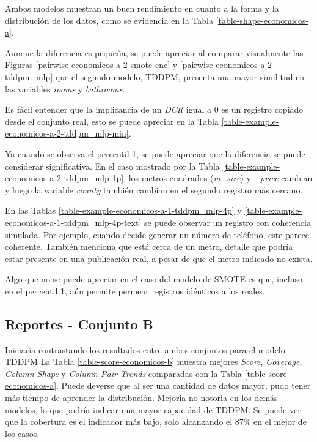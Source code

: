 Ambos modelos muestran un buen rendimiento en cuanto a la forma y la distribución de los datos, como se evidencia en la Tabla \ref{table-shape-economicos-a}.
%

%
\newpage
Aunque la diferencia es pequeña, se puede apreciar al comparar visualmente las Figuras \ref{pairwise-economicos-a-2-smote-enc} y \ref{pairwise-economicos-a-2-tddpm_mlp} que el segundo modelo, TDDPM, presenta una mayor similitud en las variables \emph{rooms} y \emph{bathrooms}.


\newpage
Es fácil entender que la implicancia de un \emph{DCR} igual a 0 es un registro copiado desde el conjunto real, esto se puede apreciar en la Tabla \ref{table-example-economicos-a-2-tddpm_mlp-min}.

Ya cuando se observa el percentil 1, se puede apreciar que la diferencia se puede considerar significativa. En el caso mostrado por la Tabla \ref{table-example-economicos-a-2-tddpm_mlp-1p}, los metros cuadrados (\emph{m\_size}) y \emph{\_price} cambian y luego la variable \emph{county} también cambian en el segundo registro más cercano.

\newpage
En las Tablas \ref{table-example-economicos-a-1-tddpm_mlp-4p} y \ref{table-example-economicos-a-1-tddpm_mlp-4p-text} se puede observar un registro con coherencia simulada. Por ejemplo, cuando decide generar un número de teléfono, este parece coherente. También menciona que está cerca de un metro, detalle que podría estar presente en una publicación real, a pesar de que el metro indicado no exista.


\newpage
Algo que no se puede apreciar en el caso del modelo de SMOTE es que, incluso en el percentil 1, aún permite permear registros idénticos a los reales.




\newpage
\subsection{Reportes - Conjunto B}
\label{ds-conjunto-b}
Iniciaría contrastando los resultados entre ambos conjuntos para el modelo TDDPM La Tabla \ref{table-score-economicos-b} muestra mejores \emph{Score}, \emph{Coverage}, \emph{Column Shape} y \emph{Column Pair Trends} comparadas con la Tabla \ref{table-score-economicos-a}. Puede deverse que al ser una cantidad de datos mayor, pudo tener más tiempo de aprender la distribución. Mejoria no notoria en los demás modelos, lo que podría indicar una mayor capacidad de TDDPM. Se puede ver que la cobertura es el indicador más bajo, solo alcanzando el 87\% en el mejor de los casos.

